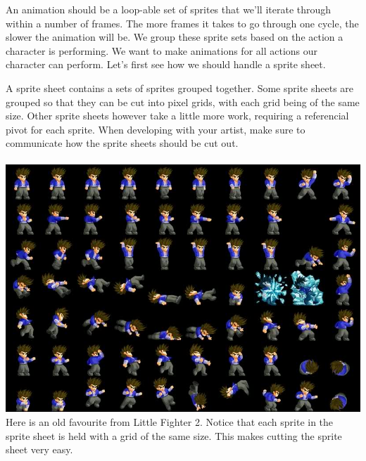 \documentclass[12pt]{article}
\begin{document}
An animation should be a loop-able set of sprites that we'll iterate through within a number of frames. The more frames it takes to go through one cycle, the slower the animation will be. We group these sprite sets based on the action a character is performing. We want to make animations for all actions our character can perform. Let's first see how we should handle a sprite sheet.

A sprite sheet contains a sets of sprites grouped together. Some sprite sheets are grouped so that they can be cut into pixel grids, with each grid being of the same size. Other sprite sheets however take a little more work, requiring a referencial pivot for each sprite. When developing with your artist, make sure to communicate how the sprite sheets should be cut out. \\\\
\includegraphics[scale=0.35]{Figure0411} \\

Here is an old favourite from Little Fighter 2. Notice that each sprite in the sprite sheet is held with a grid of the same size. This makes cutting the sprite sheet very easy.
\end{document}
